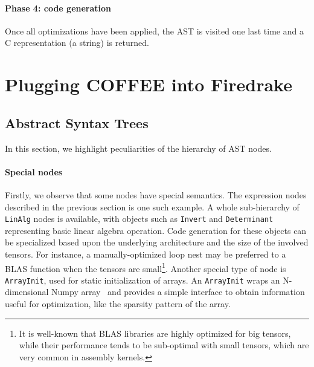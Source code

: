 \paragraph{Phase 4: code generation}
Once all optimizations have been applied, the AST is visited one last time and a C representation (a string) is returned.

\section{Plugging COFFEE into Firedrake}
\label{sec:coffee-implementation}

\subsection{Abstract Syntax Trees}
In this section, we highlight peculiarities of the hierarchy of AST nodes.

\paragraph{Special nodes}
Firstly, we observe that some nodes have special semantics. The expression nodes described in the previous section is one such example. A whole sub-hierarchy of \texttt{LinAlg} nodes is available, with objects such as \texttt{Invert} and \texttt{Determinant} representing basic linear algebra operation. Code generation for these objects can be specialized based upon the underlying architecture and the size of the involved tensors. For instance, a manually-optimized loop nest may be preferred to a BLAS function when the tensors are small\footnote{It is well-known that BLAS libraries are highly optimized for big tensors, while their performance tends to be sub-optimal with small tensors, which are very common in assembly kernels.}. Another special type of node is \texttt{ArrayInit}, used for static initialization of arrays. An \texttt{ArrayInit} wraps an N-dimensional Numpy array~\cite{Numpy} and provides a simple interface to obtain information useful for optimization, like the sparsity pattern of the array. 

